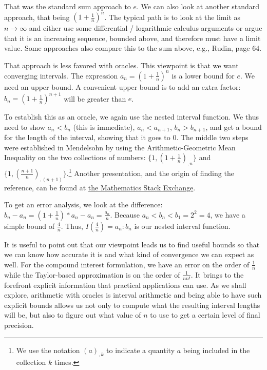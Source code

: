 \documentclass[12pt]{article}
\theoremstyle{remark}
\begin{document}
That was the standard sum approach to $e$. We can also look at another standard approach, that being $(1+\frac{1}{n})^n$. The typical path is to look at the limit as $n\to \infty$ and either use some differential / logarithmic calculus arguments or argue that it is an increasing sequence, bounded above, and therefore must have a limit value. Some approaches also compare this to the sum above, e.g., Rudin\cite{rudin}, page 64. 

That approach is less favored with oracles. This viewpoint is that we want converging intervals. The expression $a_n = (1+\frac{1}{n})^n$ is a lower bound for $e$. We need an upper bound. A convenient upper bound is to add an extra factor: $b_n = (1+\frac{1}{n})^{n+1}$ will be greater than $e$. 

To establish this as an oracle, we again use the nested interval function. We thus need to show $a_n < b_n$ (this is immediate), $a_n < a_{n+1}$, $b_n > b_{n+1}$, and get a bound for the length of the interval, showing that it goes to 0. The middle two steps were established in Mendelsohn \cite{mend} by using the Arithmetic-Geometric Mean Inequality on the two collections of numbers: $\{1, (1+ \frac{1}{n})_{,n} \}$ and $\{1, (\frac{n+1}{n})_{,(n+1)}\}$.\footnote{We use the notation $(a)_{,k}$ to indicate a quantity $a$ being included in the collection $k$ times.} Another presentation, and the origin of finding the reference, can be found at \href{https://math.stackexchange.com/questions/389793/what-is-the-most-elementary-proof-that-lim-n-to-infty-11-nn-exists}{the Mathematics Stack Exchange}.

To get an error analysis, we look at the difference: $b_n - a_n = (1+\tfrac{1}{n})*a_n - a_n = \tfrac{a_n}{n}$. Because $a_n < b_n < b_1=2^2 = 4$, we have a simple bound of $\tfrac{4}{n}$. Thus, $I(\tfrac{4}{n}) =  a_n:b_n$ is our nested interval function. 

It is useful to point out that our viewpoint leads us to find useful bounds so that we can know how accurate it is and what kind of convergence we can expect as well. For the compound interest formulation, we have an error on the order of $\frac{1}{n}$ while the Taylor-based approximation is on the order of $\frac{1}{n n!}$. It brings to the forefront explicit information that practical applications can use. As we shall explore, arithmetic with oracles is interval arithmetic and being able to have such explicit bounds allows us not only to compute what the resulting interval lengths will be, but also to figure out what value of $n$ to use to get a certain level of final precision. 
\end{document}
